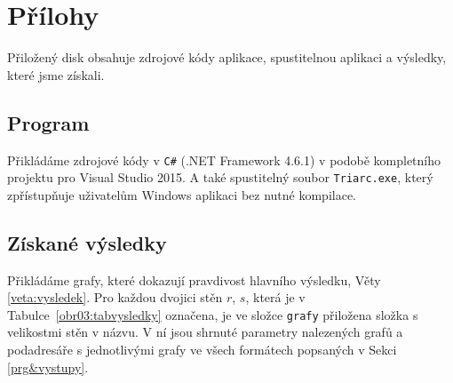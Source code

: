 \documentclass[12pt,a4paper]{report}
\let\openright=\clearpage
\begin{document}



\tableofcontents















\appendix
\chapter{Přílohy}
Přiložený disk obsahuje zdrojové kódy aplikace, spustitelnou aplikaci a výsledky, které jsme získali.

\section{Program} \label{priloha:aplikace}
Přikládáme zdrojové kódy v \texttt{C\#} (.NET Framework 4.6.1) v podobě kompletního projektu pro  Visual Studio 2015. A také spustitelný soubor \texttt{Triarc.exe}, který zpřístupňuje uživatelům Windows aplikaci bez nutné kompilace.
 
\section{Získané výsledky} \label{priloha:vysledky}
Přikládáme grafy, které dokazují pravdivost hlavního výsledku, Věty \ref{veta:vysledek}. Pro každou dvojici stěn $r$, $s$, která je v Tabulce~\ref{obr03:tabvysledky} označena, je ve složce \texttt{grafy} přiložena složka s velikostmi stěn v názvu. V ní jsou shrnuté parametry nalezených grafů a podadresáře s jednotlivými grafy ve všech formátech popsaných v Sekci \ref{prg&vystupy}.
\openright
\end{document}
